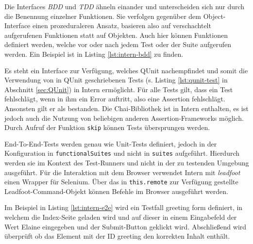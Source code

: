 Die Interfaces \textit{BDD} und \textit{TDD} ähneln einander und unterscheiden sich nur durch die Benennung einzelner Funktionen. Sie verfolgen gegenüber dem Object-Interface einen prozeduraleren Ansatz, basieren also auf verschachtelt aufgerufenen Funktionen statt auf Objekten. Auch hier können Funktionen definiert werden, welche vor oder nach jedem Test oder der Suite aufgerufen werden. Ein Beispiel ist in Listing \ref{lst:intern-bdd} zu finden. \cite{intern-userguide}

\begin{figure}[H]
	
\end{figure}

Es steht ein Interface zur Verfügung, welches QUnit nachempfindet und somit die Verwendung von in QUnit geschriebenen Tests (s. Listing \ref{lst:qunit-test} in Abschnitt \ref{sec:QUnit}) in Intern ermöglicht. Für alle Tests gilt, dass ein Test fehlschlägt, wenn in ihm ein Error auftritt, also eine Assertion fehlschlägt. Ansonsten gilt er als bestanden. Die Chai-Bibliothek ist in Intern enthalten, es ist jedoch auch die Nutzung von beliebigen anderen Assertion-Frameworks möglich. Durch Aufruf der Funktion \texttt{skip} können Tests übersprungen werden. \cite{intern-userguide}

End-To-End-Tests werden genau wie Unit-Tests definiert, jedoch in der Konfiguration in \texttt{functionalSuites} und nicht in \texttt{suites} aufgeführt. Hierdurch werden sie im Kontext des Test-Runners und nicht in der zu testenden Umgebung ausgeführt. Für die Interaktion mit dem Browser verwendet Intern mit \textit{leadfoot} einen Wrapper für Selenium. Über das in \texttt{this.remote} zur Verfügung gestellte Leadfoot-Command-Objekt können Befehle im Browser ausgeführt werden. \cite{intern-userguide}

\begin{figure}[H]
	
\end{figure}

Im Beispiel in Listing \ref{lst:intern-e2e} wird ein Testfall \glqq greeting form\grqq{} definiert, in welchem die Index-Seite geladen wird und auf dieser in einem Eingabefeld der Wert \glqq Elaine\grqq{} eingegeben und der Submit-Button geklickt wird. Abschließend wird überprüft ob das Element mit der ID \glqq greeting\grqq{} den korrekten Inhalt enthält.

